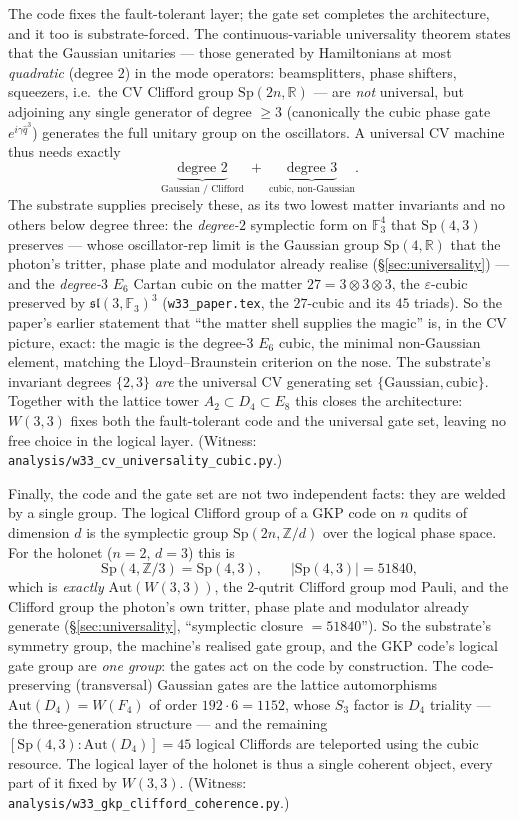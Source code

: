 \documentclass[11pt]{article}
\begin{document}
The code fixes the fault-tolerant layer; the gate set completes the
architecture, and it too is substrate-forced. The continuous-variable
universality theorem \cite{lloyd-braunstein} states that the Gaussian unitaries
--- those generated by Hamiltonians at most \emph{quadratic} (degree $2$) in the
mode operators: beamsplitters, phase shifters, squeezers, i.e.\ the CV Clifford
group $\mathrm{Sp}(2n,\mathbb R)$ --- are \emph{not} universal, but adjoining any
single generator of degree $\ge 3$ (canonically the cubic phase gate
$e^{i\gamma\hat q^3}$) generates the full unitary group on the oscillators. A
universal CV machine thus needs exactly
\[
  \underbrace{\text{degree }2}_{\text{Gaussian / Clifford}}
  \;+\;
  \underbrace{\text{degree }3}_{\text{cubic, non-Gaussian}} .
\]
The substrate supplies precisely these, as its two lowest matter invariants and
no others below degree three: the \emph{degree-$2$} symplectic form on
$\mathbb F_3^4$ that $\mathrm{Sp}(4,3)$ preserves --- whose oscillator-rep limit
is the Gaussian group $\mathrm{Sp}(4,\mathbb R)$ that the photon's tritter,
phase plate and modulator already realise (\S\ref{sec:universality}) --- and the
\emph{degree-$3$} $E_6$ Cartan cubic on the matter $27=3\otimes3\otimes3$, the
$\varepsilon$-cubic preserved by $\mathfrak{sl}(3,\mathbb F_3)^{3}$
(\texttt{w33\_paper.tex}, the $27$-cubic and its $45$ triads). So the paper's
earlier statement that ``the matter shell supplies the magic'' is, in the CV
picture, exact: the magic is the degree-$3$ $E_6$ cubic, the minimal
non-Gaussian element, matching the Lloyd--Braunstein criterion on the nose. The
substrate's invariant degrees $\{2,3\}$ \emph{are} the universal CV generating
set $\{\text{Gaussian},\text{cubic}\}$. Together with the lattice tower
$A_2\subset D_4\subset E_8$ this closes the architecture: $W(3,3)$ fixes both the
fault-tolerant code and the universal gate set, leaving no free choice in the
logical layer. (Witness: \texttt{analysis/w33\_cv\_universality\_cubic.py}.)

Finally, the code and the gate set are not two independent facts: they are welded
by a single group. The logical Clifford group of a GKP code on $n$ qudits of
dimension $d$ is the symplectic group $\mathrm{Sp}(2n,\mathbb Z/d)$ over the
logical phase space. For the holonet ($n=2$, $d=3$) this is
\[
  \mathrm{Sp}(4,\mathbb Z/3)=\mathrm{Sp}(4,3),\qquad |\mathrm{Sp}(4,3)|=51840,
\]
which is \emph{exactly} $\mathrm{Aut}(W(3,3))$, the $2$-qutrit Clifford group mod
Pauli, and the Clifford group the photon's own tritter, phase plate and
modulator already generate (\S\ref{sec:universality}, ``symplectic closure
$=51840$''). So the substrate's symmetry group, the machine's realised gate
group, and the GKP code's logical gate group are \emph{one group}: the gates act
on the code by construction. The code-preserving (transversal) Gaussian gates
are the lattice automorphisms $\mathrm{Aut}(D_4)=W(F_4)$ of order
$192\cdot 6=1152$, whose $S_3$ factor is $D_4$ triality --- the three-generation
structure --- and the remaining $[\mathrm{Sp}(4,3):\mathrm{Aut}(D_4)]=45$ logical
Cliffords are teleported using the cubic resource. The logical layer of the
holonet is thus a single coherent object, every part of it fixed by $W(3,3)$.
(Witness: \texttt{analysis/w33\_gkp\_clifford\_coherence.py}.)
\end{document}
